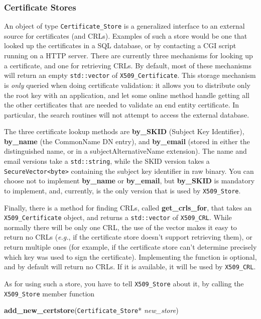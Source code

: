 \documentclass{article}
\newcommand{\function}[1]{\textbf{#1}}
\newcommand{\type}[1]{\texttt{#1}}
\renewcommand{\arg}[1]{\textsl{#1}}
\newcommand{\eg}[0]{\emph{e.g.}}
\begin{document}
\subsubsection{Certificate Stores}

An object of type \type{Certificate\_Store} is a generalized interface
to an external source for certificates (and CRLs). Examples of such a
store would be one that looked up the certificates in a SQL database,
or by contacting a CGI script running on a HTTP server. There are
currently three mechanisms for looking up a certificate, and one for
retrieving CRLs. By default, most of these mechanisms will return an
empty \type{std::vector} of \type{X509\_Certificate}. This storage
mechanism is \emph{only} queried when doing certificate validation: it
allows you to distribute only the root key with an application, and
let some online method handle getting all the other certificates that
are needed to validate an end entity certificate. In particular, the
search routines will not attempt to access the external database.

The three certificate lookup methods are \function{by\_SKID} (Subject Key
Identifier), \function{by\_name} (the CommonName DN entry), and
\function{by\_email} (stored in either the distinguished name, or in a
subjectAlternativeName extension). The name and email versions take a
\type{std::string}, while the SKID version takes a \type{SecureVector<byte>}
containing the subject key identifier in raw binary. You can choose not to
implement \function{by\_name} or \function{by\_email}, but \function{by\_SKID}
is mandatory to implement, and, currently, is the only version that is used by
\type{X509\_Store}.

Finally, there is a method for finding CRLs, called
\function{get\_crls\_for}, that takes an \type{X509\_Certificate}
object, and returns a \type{std::vector} of \type{X509\_CRL}. While
normally there will be only one CRL, the use of the vector makes it
easy to return no CRLs (\eg, if the certificate store doesn't support
retrieving them), or return multiple ones (for example, if the
certificate store can't determine precisely which key was used to sign
the certificate). Implementing the function is optional, and by
default will return no CRLs. If it is available, it will be used by
\type{X509\_CRL}.

As for using such a store, you have to tell \type{X509\_Store} about
it, by calling the \type{X509\_Store} member function

\function{add\_new\_certstore}(\type{Certificate\_Store}* \arg{new\_store})
\end{document}
